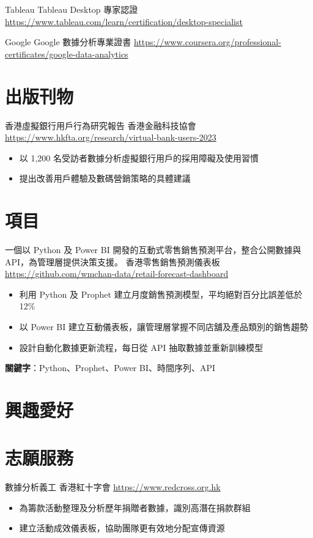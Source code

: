 \documentclass[a4paper, serif, 10pt]{moderncv}
\begin{document}
        {Tableau}
        {Tableau Desktop 專家認證}
        {\url{https://www.tableau.com/learn/certification/desktop-specialist}}
        {}
        {}

        {Google}
        {Google 數據分析專業證書}
        {\url{https://www.coursera.org/professional-certificates/google-data-analytics}}
        {}
        {}
\section{出版刊物}

        {香港虛擬銀行用戶行為研究報告}
        {香港金融科技協會}
        {\url{https://www.hkfta.org/research/virtual-bank-users-2023}}
        {}
        {\begin{itemize}
\item 以 1,200 名受訪者數據分析虛擬銀行用戶的採用障礙及使用習慣
\item 提出改善用戶體驗及數碼營銷策略的具體建議
\end{itemize}}
\section{項目}

        {一個以 Python 及 Power BI 開發的互動式零售銷售預測平台，整合公開數據與 API，為管理層提供決策支援。}
        {香港零售銷售預測儀表板}
        {\url{https://github.com/wmchan-data/retail-forecast-dashboard}}
        {}
        {\begin{itemize}
\item 利用 Python 及 Prophet 建立月度銷售預測模型，平均絕對百分比誤差低於 12\%
\item 以 Power BI 建立互動儀表板，讓管理層掌握不同店舖及產品類別的銷售趨勢
\item 設計自動化數據更新流程，每日從 API 抽取數據並重新訓練模型
\end{itemize}
\textbf{關鍵字}：Python、Prophet、Power BI、時間序列、API}
\section{興趣愛好}

\section{志願服務}

        {數據分析義工}
        {香港紅十字會}
        {\url{https://www.redcross.org.hk}}
        {}
        {\begin{itemize}
\item 為籌款活動整理及分析歷年捐贈者數據，識別高潛在捐款群組
\item 建立活動成效儀表板，協助團隊更有效地分配宣傳資源
\end{itemize}}
    
\end{document}
